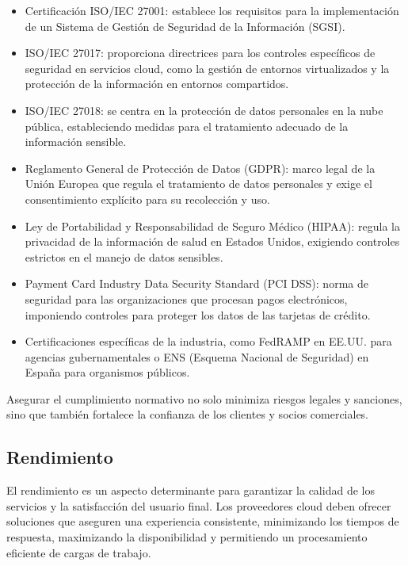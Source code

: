 {                \begin{itemize}
                    \item Certificación ISO/IEC 27001: establece los requisitos para la implementación de un Sistema de Gestión de Seguridad de la Información (SGSI).
                    \item ISO/IEC 27017: proporciona directrices para los controles específicos de seguridad en servicios cloud, como la gestión de entornos virtualizados y la protección de la información en entornos compartidos.
                    \item ISO/IEC 27018: se centra en la protección de datos personales en la nube pública, estableciendo medidas para el tratamiento adecuado de la información sensible.
                    \item Reglamento General de Protección de Datos (GDPR): marco legal de la Unión Europea que regula el tratamiento de datos personales y exige el consentimiento explícito para su recolección y uso.
                    \item Ley de Portabilidad y Responsabilidad de Seguro Médico (HIPAA): regula la privacidad de la información de salud en Estados Unidos, exigiendo controles estrictos en el manejo de datos sensibles.
                    \item Payment Card Industry Data Security Standard (PCI DSS): norma de seguridad para las organizaciones que procesan pagos electrónicos, imponiendo controles para proteger los datos de las tarjetas de crédito.
                    \item Certificaciones específicas de la industria, como FedRAMP en EE.UU. para agencias gubernamentales o ENS (Esquema Nacional de Seguridad) en España para organismos públicos.
                \end{itemize}
                
                Asegurar el cumplimiento normativo no solo minimiza riesgos legales y sanciones, sino que también fortalece la confianza de los clientes y socios comerciales.
                
        \subsection{Rendimiento}
            El rendimiento es un aspecto determinante para garantizar la calidad de los servicios y la satisfacción del usuario final. Los proveedores cloud deben ofrecer soluciones que aseguren una experiencia consistente, minimizando los tiempos de respuesta, maximizando la disponibilidad y permitiendo un procesamiento eficiente de cargas de trabajo.
                
}

